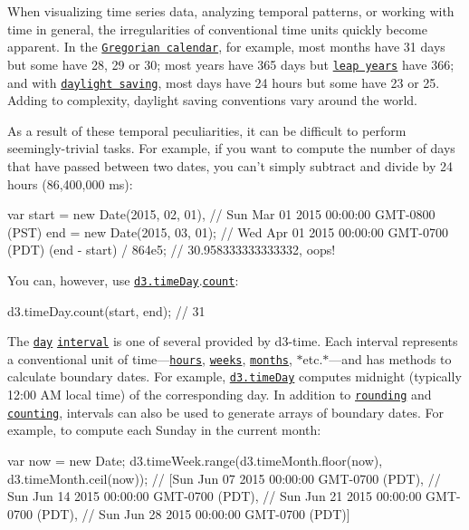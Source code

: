 When visualizing time series data, analyzing temporal patterns, or working with time in general, the irregularities of conventional time units quickly become apparent. In the \href{https://en.wikipedia.org/wiki/Gregorian_calendar}{\tt Gregorian calendar}, for example, most months have 31 days but some have 28, 29 or 30; most years have 365 days but \href{https://en.wikipedia.org/wiki/Leap_year}{\tt leap years} have 366; and with \href{https://en.wikipedia.org/wiki/Daylight_saving_time}{\tt daylight saving}, most days have 24 hours but some have 23 or 25. Adding to complexity, daylight saving conventions vary around the world.

As a result of these temporal peculiarities, it can be difficult to perform seemingly-\/trivial tasks. For example, if you want to compute the number of days that have passed between two dates, you can’t simply subtract and divide by 24 hours (86,400,000 ms)\+:


\begin{DoxyCode}
var start = new Date(2015, 02, 01), // Sun Mar 01 2015 00:00:00 GMT-0800 (PST)
    end = new Date(2015, 03, 01); // Wed Apr 01 2015 00:00:00 GMT-0700 (PDT)
(end - start) / 864e5; // 30.958333333333332, oops!
\end{DoxyCode}


You can, however, use \href{#timeDay}{\tt d3.\+time\+Day}.\href{#interval_count}{\tt count}\+:


\begin{DoxyCode}
d3.timeDay.count(start, end); // 31
\end{DoxyCode}


The \href{#day}{\tt day} \href{#api-reference}{\tt interval} is one of several provided by d3-\/time. Each interval represents a conventional unit of time—\href{#timeHour}{\tt hours}, \href{#timeWeek}{\tt weeks}, \href{#timeMonth}{\tt months}, $\ast$etc.$\ast$—and has methods to calculate boundary dates. For example, \href{#timeDay}{\tt d3.\+time\+Day} computes midnight (typically 12\+:00 AM local time) of the corresponding day. In addition to \href{#interval_round}{\tt rounding} and \href{#interval_count}{\tt counting}, intervals can also be used to generate arrays of boundary dates. For example, to compute each Sunday in the current month\+:


\begin{DoxyCode}
var now = new Date;
d3.timeWeek.range(d3.timeMonth.floor(now), d3.timeMonth.ceil(now));
// [Sun Jun 07 2015 00:00:00 GMT-0700 (PDT),
//  Sun Jun 14 2015 00:00:00 GMT-0700 (PDT),
//  Sun Jun 21 2015 00:00:00 GMT-0700 (PDT),
//  Sun Jun 28 2015 00:00:00 GMT-0700 (PDT)]
\end{DoxyCode}


